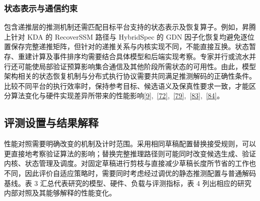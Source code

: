 \documentclass[11pt,a4paper,UTF8,fontset=none,scheme=plain,zihao=-4]{ctexart}
\begin{document}
\hypertarget{section-7-4-2}{%
\subsubsection{状态表示与通信约束}\label{section-7-4-2}}

包含递推层的推测机制还需匹配目标平台支持的状态表示及恢复算子。例如，昇腾上针对
KDA 的 RecoverSSM 路径与 HybridSpec 的 GDN
因子化恢复均避免逐位置保存完整递推矩阵，但针对的递推关系与内核实现不同，不能直接互换。状态暂存、重建计算及事件排序均需要结合具体模型和后端实现考察。专家并行或流水并行还可能使局部验证预算影响集合通信及其他阶段所需状态的可用性。由此，模型架构相关的状态恢复机制与分布式执行协议需要共同满足推测解码的正确性条件。比较不同平台的执行效率时，保持参考目标、候选语义及保真性要求一致，才能区分算法变化与硬件实现差异所带来的性能影响\protect\hyperlink{ref-hybridspec}{{[}9{]}},~\protect\hyperlink{ref-ascenddocs}{{[}72{]}},~\protect\hyperlink{ref-sglppcommit}{{[}79{]}},~\protect\hyperlink{ref-vllmdynamic034}{{[}83{]}},~\protect\hyperlink{ref-vllmdynamiclatest}{{[}84{]}}。

\hypertarget{section-7-5}{%
\subsection{评测设置与结果解释}\label{section-7-5}}

性能对照需要明确改变的机制及计时范围。采用相同草稿配置替换接受规则，可以更直接地考察验证算法的影响；替换完整推理路径则可能同时改变候选生成、验证内核、状态管理及调度。对固定草稿进行剪枝与直接减少草稿长度所节省的工作也不同，因此评价自适应策略时，需要同时考虑经过调优的静态推测配置与普通解码基线。表
3 汇总代表研究的模型、硬件、负载与评测指标，表 4
列出相应的研究内部对照及其能够解释的性能变化。
\end{document}
